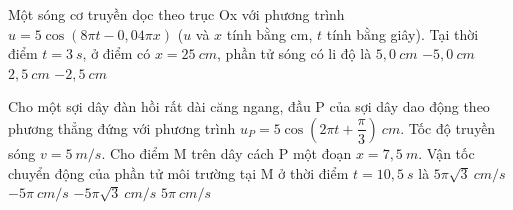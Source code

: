 	\begin{ex}%
		Một sóng cơ truyền dọc theo trục Ox với phương trình $u = 5\cos(8\pi t - 0,04\pi x)$ ($u$ và $x$ tính bằng cm, $t$ tính bằng giây). Tại thời điểm $t = 3\ s$, ở điểm có $x = 25\ cm$, phần tử sóng có li độ là
		\choice
		{$5,0\ cm$}
		{\True $-5,0\ cm$}
		{$2,5\ cm$}
		{$-2,5\ cm$}
		
	\end{ex}
	
	\begin{ex}%
		Cho một sợi dây đàn hồi rất dài căng ngang, đầu P của sợi dây dao động theo phương thẳng đứng với phương trình $u_P=5\cos(2\pi t + \dfrac{\pi}{3})\ cm$. Tốc độ truyền sóng $v=5\ m/s$. Cho điểm M trên dây cách P một đoạn $x=7,5\ m$. Vận tốc chuyển động của phần tử môi trường tại M ở thời điểm $t=10,5\ s$ là
		\choice
		{$5\pi \sqrt{3}\ cm/s$}
		{$-5\pi\ cm/s$}
		{\True $-5\pi \sqrt{3}\ cm/s$}
		{$5\pi\ cm/s$}
		
	\end{ex}
	
